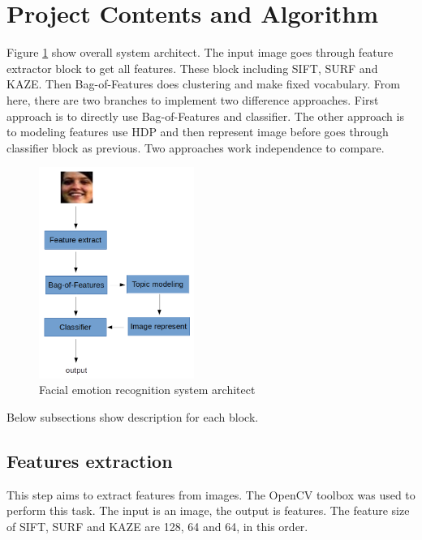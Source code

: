 \documentclass[12pt]{article}
\begin{document}

\section{Project Contents and Algorithm} \label{sec:project-contents}


Figure \ref{fig:system-architect} show overall system architect.
The input image goes through feature extractor block to get all features.
These block including SIFT, SURF and KAZE.
Then Bag-of-Features does clustering and make fixed vocabulary.
From here, there are two branches to implement two difference approaches.
First approach is to directly use Bag-of-Features and classifier.
The other approach is to modeling features use HDP and then represent image before goes through classifier block as previous.
Two approaches work independence to compare.
\begin{figure}[h!]
    \centering
    \includegraphics[width=0.45\textwidth]{system-arch-cropped.png}
    \caption{Facial emotion recognition system architect} \label{fig:system-architect}
\end{figure}

Below subsections show description for each block.

\subsection{Features extraction}
This step aims to extract features from images.
The OpenCV toolbox \cite{opencv_library} was used to perform this task.
The input is an image, the output is features.
The feature size of SIFT, SURF and KAZE are 128, 64  and 64, in this order.
\end{document}
